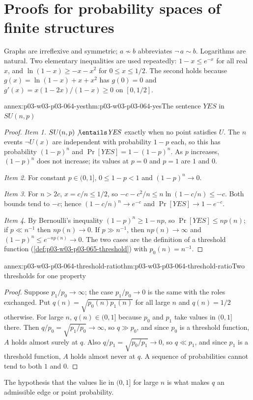 \section{Proofs for probability spaces of finite structures}
\label{sec:annex-p03-w03-p03-064-probability-spaces}

Graphs are irreflexive and symmetric; \(a\not\sim b\) abbreviates
\(\neg\,a\sim b\).  Logarithms are natural.  Two elementary inequalities are
used repeatedly: \(1-x\leq e^{-x}\) for all real \(x\), and
\(\ln(1-x)\geq-x-x^2\) for \(0\leq x\leq1/2\).  The second holds because
\(g(x)=\ln(1-x)+x+x^2\) has \(g(0)=0\) and
\(g'(x)=x(1-2x)/(1-x)\geq0\) on \([0,1/2]\).

\begin{annexitem}{annex:p03-w03-p03-064-yes}{thm:p03-w03-p03-064-yes}{The sentence \(\mathit{YES}\) in \(SU(n,p)\)}
\begin{proof}
\emph{Item 1.}  \(SU(n,p)\not\entails\mathit{YES}\) exactly when no point
satisfies \(U\).  The \(n\) events \(\neg U(x)\) are independent with
probability \(1-p\) each, so this has probability \((1-p)^n\) and
\(\Pr[\mathit{YES}]=1-(1-p)^n\).  As \(p\) increases, \((1-p)^n\) does not
increase; its values at \(p=0\) and \(p=1\) are \(1\) and \(0\).

\emph{Item 2.}  For constant \(p\in(0,1]\), \(0\leq1-p<1\) and
\((1-p)^n\to0\).

\emph{Item 3.}  For \(n>2c\), \(x=c/n\leq1/2\), so
\(-c-c^2/n\leq n\ln(1-c/n)\leq-c\).  Both bounds tend to \(-c\); hence
\((1-c/n)^n\to e^{-c}\) and \(\Pr[\mathit{YES}]\to1-e^{-c}\).

\emph{Item 4.}  By Bernoulli's inequality \((1-p)^n\geq1-np\), so
\(\Pr[\mathit{YES}]\leq np(n)\); if \(p\ll n^{-1}\) then \(np(n)\to0\).  If
\(p\gg n^{-1}\), then \(np(n)\to\infty\) and
\((1-p)^n\leq e^{-np(n)}\to0\).  The two cases are the definition of a
threshold function (\cref{def:p03-w03-p03-065-threshold}) with
\(p_0(n)=n^{-1}\).
\end{proof}
\end{annexitem}

\begin{annexitem}{annex:p03-w03-p03-064-threshold-ratio}{thm:p03-w03-p03-064-threshold-ratio}{Two thresholds for one property}
\begin{proof}
Suppose \(p_1/p_0\to\infty\); the case \(p_1/p_0\to0\) is the same with the
roles exchanged.  Put \(q(n)=\sqrt{p_0(n)p_1(n)}\) for all large \(n\) and
\(q(n)=1/2\) otherwise.  For large \(n\), \(q(n)\in(0,1]\) because \(p_0\) and
\(p_1\) take values in \((0,1]\) there.  Then
\(q/p_0=\sqrt{p_1/p_0}\to\infty\), so \(q\gg p_0\), and since \(p_0\) is a
threshold function, \(A\) holds almost surely at \(q\).  Also
\(q/p_1=\sqrt{p_0/p_1}\to0\), so \(q\ll p_1\), and since \(p_1\) is a
threshold function, \(A\) holds almost never at \(q\).  A sequence of
probabilities cannot tend to both \(1\) and \(0\).
\end{proof}
The hypothesis that the values lie in \((0,1]\) for large \(n\) is what makes
\(q\) an admissible edge or point probability.
\end{annexitem}

